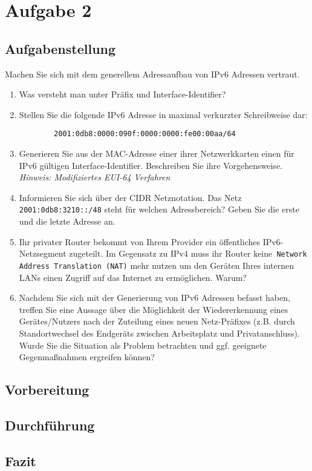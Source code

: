 \newpage

\section{Aufgabe 2}

\subsection{Aufgabenstellung}
Machen Sie sich mit dem generellem Adressaufbau von IPv6 Adressen vertraut.
\begin{enumerate}[label=(\alph*)]
	\item Was versteht man unter Präfix und Interface-Identifier?
	\item  Stellen Sie die folgende IPv6 Adresse in maximal verkurzter Schreibweise dar:
\begin{lstlisting}
		2001:0db8:0000:090f:0000:0000:fe00:00aa/64
\end{lstlisting}
	\item Generieren Sie aus der MAC-Adresse einer ihrer Netzwerkkarten einen für IPv6 gültigen Interface-Identifier. Beschreiben Sie ihre Vorgehensweise.\\
	\textit{Hinweis: Modifiziertes EUI-64 Verfahren}
	\item  Informieren Sie sich über der CIDR Netznotation. Das Netz \texttt{2001:0db8:3210::/48} steht für welchen Adressbereich? Geben Sie die erste und die letzte Adresse an.
	\item Ihr privater Router bekommt von Ihrem Provider ein öffentliches IPv6-Netzsegment zugeteilt. Im Gegensatz zu IPv4 muss ihr Router keine\texttt{ Network Address Translation (NAT)} mehr nutzen um den Geräten Ihres internen LANs einen Zugriff auf das Internet zu ermöglichen. Warum?
	\item Nachdem Sie sich mit der Generierung von IPv6 Adressen befasst haben, treffen Sie eine Aussage über die Möglichkeit der Wiedererkennung eines Gerätes/Nutzers nach der Zuteilung eines neuen Netz-Präfixes (z.B. durch Standortwechsel des Endgeräts zwischen Arbeitsplatz und Privatanschluss). Wurde Sie die Situation als Problem betrachten und ggf. geeignete Gegenmaßnahmen ergreifen können?
\end{enumerate}

\subsection{Vorbereitung}

\subsection{Durchführung}

\subsection{Fazit}